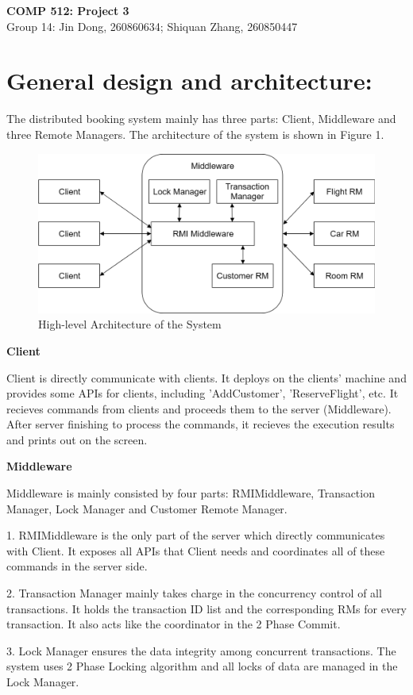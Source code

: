 \documentclass[a4paper, 12pt]{article}
\title{}
\author{Jin Dong}
\newcommand{\newAssignment}[2]{
	\begin{center}
  		\textbf{{\huge #1}}\vspace{10pt} \\
  		{\large #2}\vspace{15pt}
	\end{center}
}
\newcommand{\newQuestion}[1]{\section{#1}}
\newcommand{\newPart}[1]{\textbf{\large #1}}
\begin{document}
\newAssignment{COMP 512: Project 3 }{Group 14: Jin Dong, 260860634; Shiquan Zhang, 260850447}

\newQuestion{General design and architecture:} 

The distributed booking system mainly has three parts: Client, Middleware and three Remote Managers. The architecture of the system is shown in Figure 1.

\begin{figure}[H]
    \centering
    \includegraphics[width=0.8\linewidth]{Distributed_Booking_System.png}
    \caption{High-level Architecture of the System}
    \label{fig:Figure_1}
\end{figure}

\newPart{Client}

Client is directly communicate with clients. It deploys on the clients' machine and provides some APIs for clients, including 'AddCustomer', 'ReserveFlight', etc. It recieves commands from clients and proceeds them to the server (Middleware). 
After server finishing to process the commands, it recieves the execution results and prints out on the screen.

\newPart{Middleware}

Middleware is mainly consisted by four parts: RMIMiddleware, Transaction Manager, Lock Manager and Customer Remote Manager. 

1. RMIMiddleware is the only part of the server which directly communicates with Client. It exposes all APIs that Client needs and coordinates all of these commands in the server side. 

2. Transaction Manager mainly takes charge in the concurrency control of all transactions. It holds the transaction ID list and the corresponding RMs for every transaction. It also acts like the coordinator in the 2 Phase Commit.

3. Lock Manager ensures the data integrity among concurrent transactions. The system uses 2 Phase Locking algorithm and all locks of data are managed in the Lock Manager.
\end{document}
